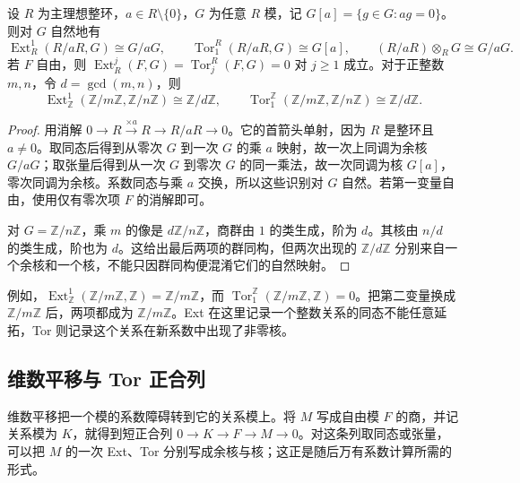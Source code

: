 \begin{proposition}\label{g2:prop:cyclic-ext-tor}
	设 \(R\) 为主理想整环，\(a\in R\setminus\{0\}\)，\(G\) 为任意 \(R\) 模，记 \(G[a]=\{g\in G:ag=0\}\)。则对 \(G\) 自然地有
	\[
		\operatorname{Ext}_R^1(R/aR,G)\cong G/aG,\qquad
		\operatorname{Tor}^R_1(R/aR,G)\cong G[a],\qquad
		(R/aR)\otimes_R G\cong G/aG.
	\]
	若 \(F\) 自由，则 \(\operatorname{Ext}_R^j(F,G)=\operatorname{Tor}^R_j(F,G)=0\) 对 \(j\ge1\) 成立。对于正整数 \(m,n\)，令 \(d=\gcd(m,n)\)，则
	\[
		\operatorname{Ext}_{\mathbb Z}^1(\mathbb Z/m\mathbb Z,\mathbb Z/n\mathbb Z)\cong\mathbb Z/d\mathbb Z,\qquad
		\operatorname{Tor}^{\mathbb Z}_1(\mathbb Z/m\mathbb Z,\mathbb Z/n\mathbb Z)\cong\mathbb Z/d\mathbb Z.
	\]
\end{proposition}
\begin{proof}
	用消解 \(0\to R\xrightarrow{\times a}R\to R/aR\to0\)。它的首箭头单射，因为 \(R\) 是整环且 \(a\ne0\)。取同态后得到从零次 \(G\) 到一次 \(G\) 的乘 \(a\) 映射，故一次上同调为余核 \(G/aG\)；取张量后得到从一次 \(G\) 到零次 \(G\) 的同一乘法，故一次同调为核 \(G[a]\)，零次同调为余核。系数同态与乘 \(a\) 交换，所以这些识别对 \(G\) 自然。若第一变量自由，使用仅有零次项 \(F\) 的消解即可。

	对 \(G=\mathbb Z/n\mathbb Z\)，乘 \(m\) 的像是 \(d\mathbb Z/n\mathbb Z\)，商群由 \(1\) 的类生成，阶为 \(d\)。其核由 \(n/d\) 的类生成，阶也为 \(d\)。这给出最后两项的群同构，但两次出现的 \(\mathbb Z/d\mathbb Z\) 分别来自一个余核和一个核，不能只因群同构便混淆它们的自然映射。
\end{proof}

例如，\(\operatorname{Ext}_{\mathbb Z}^1(\mathbb Z/m\mathbb Z,\mathbb Z)=\mathbb Z/m\mathbb Z\)，而 \(\operatorname{Tor}^{\mathbb Z}_1(\mathbb Z/m\mathbb Z,\mathbb Z)=0\)。把第二变量换成 \(\mathbb Z/m\mathbb Z\) 后，两项都成为 \(\mathbb Z/m\mathbb Z\)。Ext 在这里记录一个整数关系的同态不能任意延拓，Tor 则记录这个关系在新系数中出现了非零核。

\subsection{维数平移与 Tor 正合列}
\label{g2:subsec:0401:03}
维数平移把一个模的系数障碍转到它的关系模上。将 \(M\) 写成自由模 \(F\) 的商，并记关系模为 \(K\)，就得到短正合列 \(0\to K\to F\to M\to0\)。对这条列取同态或张量，可以把 \(M\) 的一次 Ext、Tor 分别写成余核与核；这正是随后万有系数计算所需的形式。

